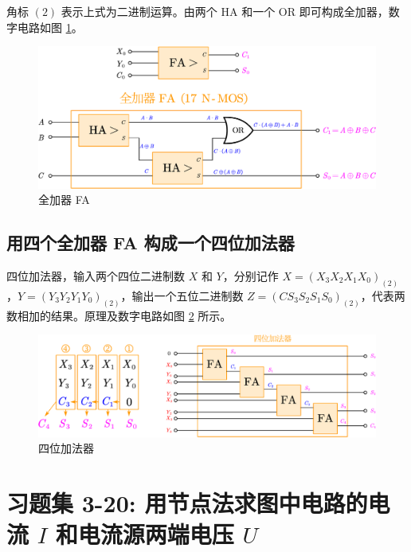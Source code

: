 \documentclass[UTF8]{report}
\theoremstyle{MyLineTheoremStyle} %
\theoremstyle{MyBlockTheoremStyle} %
\theoremstyle{MySubsubsectionStyle} %
\begin{document}
角标 $(2)$ 表示上式为二进制运算。由两个 HA 和一个 OR 即可构成全加器，数字电路如图 \ref{全加器 FA}。

\begin{figure}[H]\centering
\includegraphics[width=0.65\columnwidth]{assets/5/全加器.pdf}
\caption{ 全加器 FA}\label{全加器 FA}
\end{figure}



\subsection{用四个全加器 FA 构成一个四位加法器}

四位加法器，输入两个四位二进制数 $X$ 和 $Y$，分别记作 $ X= (X_3 X_2 X_1 X_0)_{(2)}$，$ Y=  (Y_3 Y_2 Y_1 Y_0)_{(2)}$，输出一个五位二进制数 $Z = (C S_3 S_2 S_1 S_0)_{(2)}$，代表两数相加的结果。原理及数字电路如图 \ref{四位加法器} 所示。

\begin{figure}[H]\centering
\includegraphics[width=0.9\columnwidth]{assets/5/四位加法器.pdf}
\caption{ 四位加法器}\label{四位加法器}
\end{figure}


\section{习题集 3-20: 用节点法求图中电路的电流 $I$ 和电流源两端电压 $U$}
\end{document}
